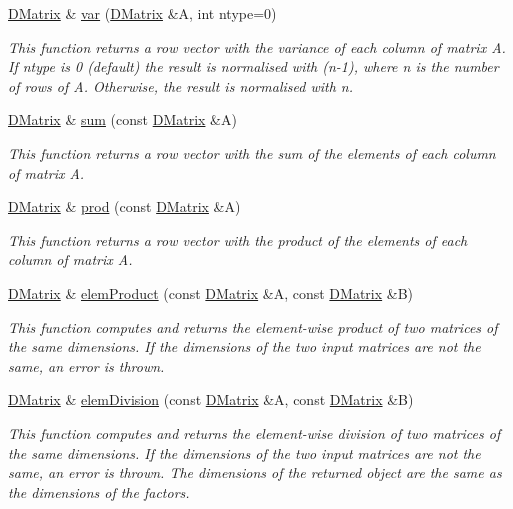 \begin{DoxyCompactItemize}
\hyperlink{classDMatrix}{DMatrix} \& \hyperlink{classDMatrix_a45de81d6d9403a02c173fadc2ffb369a}{var} (\hyperlink{classDMatrix}{DMatrix} \&A, int ntype=0)
\begin{DoxyCompactList}\small\item\em This function returns a row vector with the variance of each column of matrix A. If ntype is 0 (default) the result is normalised with (n-\/1), where n is the number of rows of A. Otherwise, the result is normalised with n. \item\end{DoxyCompactList}\item 
\hyperlink{classDMatrix}{DMatrix} \& \hyperlink{classDMatrix_a7c0db4e6107794b51335d3c767a9cb55}{sum} (const \hyperlink{classDMatrix}{DMatrix} \&A)
\begin{DoxyCompactList}\small\item\em This function returns a row vector with the sum of the elements of each column of matrix A. \item\end{DoxyCompactList}\item 
\hyperlink{classDMatrix}{DMatrix} \& \hyperlink{classDMatrix_a6cec987fa2c6fb5fb22aaa07e647adba}{prod} (const \hyperlink{classDMatrix}{DMatrix} \&A)
\begin{DoxyCompactList}\small\item\em This function returns a row vector with the product of the elements of each column of matrix A. \item\end{DoxyCompactList}\item 
\hyperlink{classDMatrix}{DMatrix} \& \hyperlink{classDMatrix_a4fcfc361ca88cbbf21c89c50eca932d8}{elemProduct} (const \hyperlink{classDMatrix}{DMatrix} \&A, const \hyperlink{classDMatrix}{DMatrix} \&B)
\begin{DoxyCompactList}\small\item\em This function computes and returns the element-\/wise product of two matrices of the same dimensions. If the dimensions of the two input matrices are not the same, an error is thrown. \item\end{DoxyCompactList}\item 
\hyperlink{classDMatrix}{DMatrix} \& \hyperlink{classDMatrix_a7d66bf14f6c28485a886ece99589d366}{elemDivision} (const \hyperlink{classDMatrix}{DMatrix} \&A, const \hyperlink{classDMatrix}{DMatrix} \&B)
\begin{DoxyCompactList}\small\item\em This function computes and returns the element-\/wise division of two matrices of the same dimensions. If the dimensions of the two input matrices are not the same, an error is thrown. The dimensions of the returned object are the same as the dimensions of the factors. \item\end{DoxyCompactList}\item 

\end{DoxyCompactItemize}
